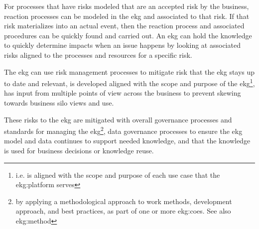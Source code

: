 \ekgmmCapabilitySectionContributionToEnterprise

For processes that have risks modeled that are an accepted risk by the business,
reaction processes can be modeled in the \gls{ekg} and associated to that risk.
If that risk materializes into an actual event,
then the reaction process and associated procedures can be quickly found and carried out.
An \gls{ekg} can hold the knowledge to quickly determine impacts when an issue happens by looking at
associated risks aligned to the processes and resources for a specific risk.

\ekgmmCapabilitySectionContributionToEKG

The \gls{ekg} can use risk management processes to mitigate risk that the \gls{ekg}
stays up to date and relevant,
is developed aligned with the scope and purpose of the \gls{ekg}\footnote{%
    i.e. is aligned with the scope and purpose of each use case that the \gls{ekg:platform} serves%
},
has input from multiple points of view across the business to prevent skewing towards business silo views and use.

These risks to the \gls{ekg} are mitigated with
overall governance processes and standards for managing the \gls{ekg}\footnote{%
    by applying a methodological approach to work methods, development approach, and best practices,
    as part of one or more \glspl{ekg:coe}. See also \gls{ekg:method}%
},
data governance processes to ensure the \gls{ekg} model and data continues to support needed knowledge,
and that the knowledge is used for business decisions or knowledge reuse.

